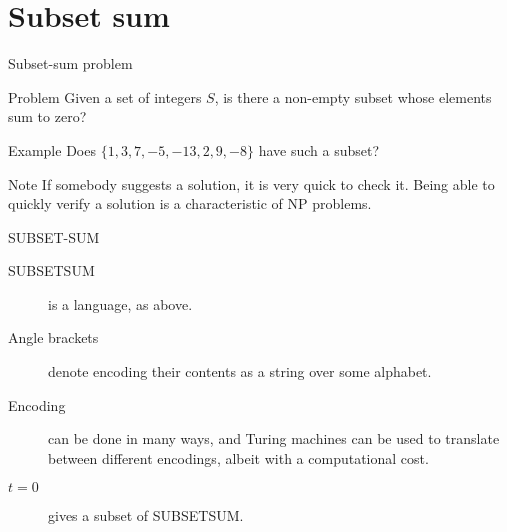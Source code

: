 \documentclass{beamer}
\begin{document}
\section{Subset sum}

\begin{frame}{Subset-sum problem}
  
    \begin{alertblock}{Problem}
      Given a set of integers $S$, is there a non-empty subset whose elements sum to zero?
    \end{alertblock}
  
    \vspace{4mm}
    
    \begin{exampleblock}{Example}
      Does $\{ 1, 3, 7, -5, -13, 2, 9, -8 \}$ have such a subset?
    \end{exampleblock}
    
    \vspace{4mm}
  
    \begin{alertblock}{Note}
       If somebody suggests a solution, it is very quick to check it.
      Being able to quickly verify a solution is a characteristic of NP problems.
    \end{alertblock}
  \end{frame}
  
  
  \begin{frame}{SUBSET-SUM}
    \begin{description}
      \item[SUBSETSUM] is a language, as above.
      \item[Angle brackets] denote encoding their contents as a string over some alphabet.
      \item[Encoding] can be done in many ways, and Turing machines can be used to translate between different encodings, albeit with a computational cost.
      \item[$t=0$] gives a subset of SUBSETSUM.
    \end{description}
  \end{frame}
  
\end{document}

